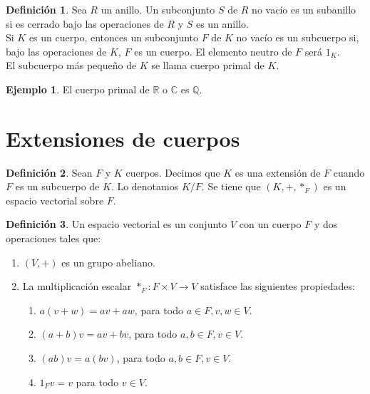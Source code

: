 \documentclass{report}
\theoremstyle{remark}
\theoremstyle{definition}
\newtheorem{definition}{Definición}[chapter]
\theoremstyle{definition}
\theoremstyle{definition}
\newtheorem*{example}{Ejemplo}
\begin{document}
\begin{definition}
    Sea $R$ un anillo. Un subconjunto $S$ de $R$ no vacío es un subanillo si es cerrado bajo las operaciones de $R$ y $S$ es un anillo.\\
    Si $K$ es un cuerpo, entonces un subconjunto $F$ de $K$ no vacío es un subcuerpo si, bajo las operaciones de $K$, $F$ es un cuerpo. El elemento neutro de $F$ será $1_K$.\\
    El subcuerpo más pequeño de $K$ se llama cuerpo primal de $K$.
\end{definition}

\begin{example}
    El cuerpo primal de $\mathbb{R}$ o $\mathbb{C}$ es $\mathbb{Q}$.
\end{example}

\section{Extensiones de cuerpos}

\begin{definition}
    Sean $F$ y $K$ cuerpos. Decimos que $K$ es una extensión de $F$ cuando $F$ es un subcuerpo de $K$. Lo denotamos $K/F$.
    Se tiene que $(K, +, *_F)$ es un espacio vectorial sobre $F$.
\end{definition}

\begin{definition}
    Un espacio vectorial es un conjunto $V$ con un cuerpo $F$ y dos operaciones tales que:
    \begin{enumerate}
        \item $(V, +)$ es un grupo abeliano.
        \item La multiplicación escalar $*_F : F \times V \to V$ satisface las siguientes propiedades:
              \begin{enumerate}
                  \item $a(v + w) = av + aw$, para todo $a \in F, v, w \in V$.
                  \item $(a + b)v = av + bv$, para todo $a, b \in F, v \in V$.
                  \item $(ab)v = a(bv)$, para todo $a, b \in F, v \in V$.
                  \item $1_Fv = v$ para todo $v \in V$.
              \end{enumerate}
    \end{enumerate}
\end{definition}
\end{document}
